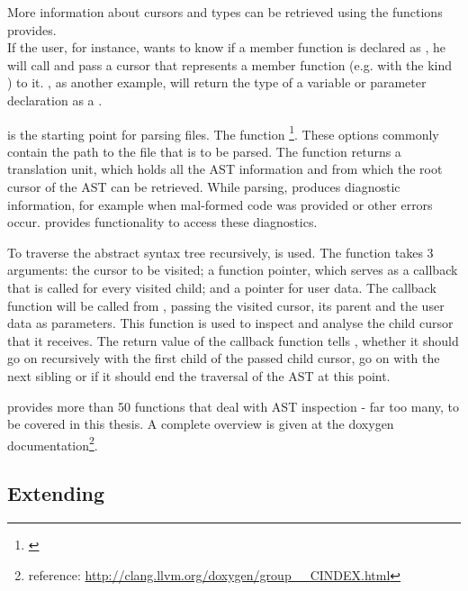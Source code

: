 More information about cursors and types can be retrieved using the functions  provides.
\\If the user, for instance, wants to know if a member function is declared as , he will call  and pass a cursor that represents a member function (e.g. with the kind ) to it. , as another example, will return the type of a variable or parameter declaration as a .

 is the starting point for parsing  files. The function \footnote{\citep{ClangAPIDoc}}. These options commonly contain the path to the  file that is to be parsed. The function returns a translation unit, which holds all the AST information and from which the root cursor of the AST can be retrieved. While parsing,  produces diagnostic information, for example when mal-formed  code was provided or other errors occur.  provides functionality to access these diagnostics.

To traverse the abstract syntax tree recursively,  is used. The function takes 3 arguments: the cursor to be visited; a function pointer, which serves as a callback that is called for every visited child; and a  pointer for user data. The callback function will be called from , passing the visited cursor, its parent and the user data as parameters. This function is used to inspect and analyse the child cursor that it receives. The return value of the callback function tells , whether it should go on recursively with the first child of the passed child cursor, go on with the next sibling or if it should end the traversal of the AST at this point.

 provides more than 50 functions that deal with AST inspection - far too many, to be covered in this thesis. A complete overview is given at the  doxygen documentation\footnote{ reference: \url{http://clang.llvm.org/doxygen/group\_\_CINDEX.html}}.

\subsection{Extending }


